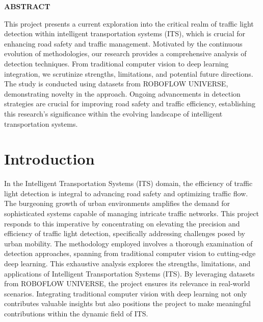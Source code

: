 \documentclass[12 pt]{report}
\begin{document}
\newpage
\begin{center}
  \begin{Large}
    \textbf{ABSTRACT}
  \end{Large}
\end{center}
\justify
This project presents a current exploration into the critical realm of traffic light detection within intelligent transportation systems (ITS), which is crucial for enhancing road safety and traffic management. Motivated by the continuous evolution of methodologies, our research provides a comprehensive analysis of detection techniques. From traditional computer vision to deep learning integration, we scrutinize strengths, limitations, and potential future directions. The study is conducted using datasets from ROBOFLOW UNIVERSE, demonstrating novelty in the approach. Ongoing advancements in detection strategies are crucial for improving road safety and traffic efficiency, establishing this research's significance within the evolving landscape of intelligent transportation systems.
\flushright

\newpage
\tableofcontents

\flushleft
\newpage
\chapter{Introduction}
\justify
In the Intelligent Transportation Systems (ITS) domain, the efficiency of traffic light detection is integral to advancing road safety and optimizing traffic flow. The burgeoning growth of urban environments amplifies the demand for sophisticated systems capable of managing intricate traffic networks. This project responds to this imperative by concentrating on elevating the precision and efficiency of traffic light detection, specifically addressing challenges posed by urban mobility. The methodology employed involves a thorough examination of detection approaches, spanning from traditional computer vision to cutting-edge deep learning. This exhaustive analysis explores the strengths, limitations, and applications of Intelligent Transportation Systems (ITS). By leveraging datasets from ROBOFLOW UNIVERSE, the project ensures its relevance in real-world scenarios. Integrating traditional computer vision with deep learning not only contributes valuable insights but also positions the project to make meaningful contributions within the dynamic field of ITS.
\flushleft
\end{document}
